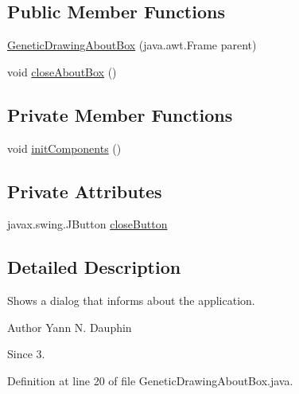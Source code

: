 \subsection*{Public Member Functions}
\begin{DoxyCompactItemize}
\item 
\hyperlink{classexamples_1_1gp_1_1monalisa_1_1gui_1_1_genetic_drawing_about_box_a1538ee62bdb67ee3025116316aa1332a}{Genetic\-Drawing\-About\-Box} (java.\-awt.\-Frame parent)
\item 
void \hyperlink{classexamples_1_1gp_1_1monalisa_1_1gui_1_1_genetic_drawing_about_box_a6d6420c6117d586944dcc0003909da44}{close\-About\-Box} ()
\end{DoxyCompactItemize}
\subsection*{Private Member Functions}
\begin{DoxyCompactItemize}
\item 
void \hyperlink{classexamples_1_1gp_1_1monalisa_1_1gui_1_1_genetic_drawing_about_box_a5f7ce51cd078012a0e295fc4cd7e4d55}{init\-Components} ()
\end{DoxyCompactItemize}
\subsection*{Private Attributes}
\begin{DoxyCompactItemize}
\item 
javax.\-swing.\-J\-Button \hyperlink{classexamples_1_1gp_1_1monalisa_1_1gui_1_1_genetic_drawing_about_box_a1a01e65f3fe0892a6f7b0238f7b078ba}{close\-Button}
\end{DoxyCompactItemize}


\subsection{Detailed Description}
Shows a dialog that informs about the application.

\begin{DoxyAuthor}{Author}
Yann N. Dauphin 
\end{DoxyAuthor}
\begin{DoxySince}{Since}
3. 
\end{DoxySince}


Definition at line 20 of file Genetic\-Drawing\-About\-Box.\-java.



